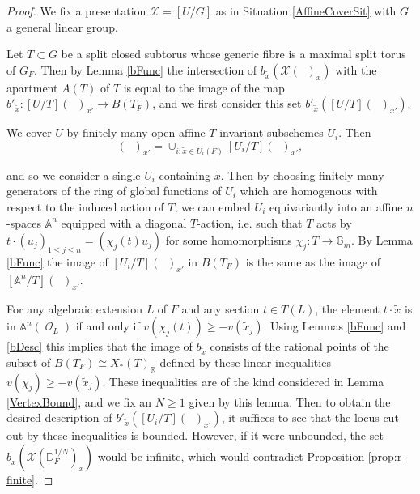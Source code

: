 \documentclass{article}
\DeclareMathOperator{\CO}{\mathcal{O}}
\newcommand{\BA}{{\mathbb{A}}}
\newcommand{\BG}{{\mathbb{G}}}
\newcommand{\BR}{{\mathbb{R}}}
\newcommand{\CX}{{\mathcal X}}
\newcommand{\Dr}[1][r]{\mathbb{D}_F^{1/#1}}
\DeclareMathOperator{\Dinfty}{\mathbb{D}_F^{1/\infty}}
\theoremstyle{definition}
\theoremstyle{plain}
\begin{document}
\begin{proof}
 We fix a presentation $\CX=[U/G]$ as in Situation \ref{AffineCoverSit} with $G$ a general linear group.

    Let $T \subset G$ be a split closed subtorus whose generic fibre is a maximal split torus of $G_F$. Then by Lemma \ref{bFunc} the intersection of $b_{\tilde x}(\CX(\Dinfty)_x)$ with the apartment $A(T)$ of $T$ is equal to the image of the map $b'_{\tilde x}\colon [U/T](\Dinfty)_{x'} \to B(T_F)$, and we first consider this set $b'_{\tilde x}([U/T](\Dinfty)_{x'})$.
    
     We cover $U$ by finitely many open affine $T$-invariant subschemes $U_i$. Then
     \begin{equation*}
         [U/T](\Dinfty)_{x'} = \cup_{i\colon \tilde x \in U_i(F)} [U_i/T](\Dinfty)_{x'},
     \end{equation*}
    
    and so we consider a single $U_i$ containing $\tilde x$. Then by choosing finitely many generators of the ring of global functions of $U_i$ which are homogenous with respect to the induced action of $T$, we can embed $U_i$ equivariantly into an affine $n$-spaces $\BA^n$ equipped with a diagonal $T$-action, i.e. such that $T$ acts by $t\cdot (u_j)_{1\leq j \leq n}=(\chi_j(t)u_j)$ for some homomorphisms $\chi_j\colon T \to \BG_m$. By Lemma \ref{bFunc} the image of $[U_i/T](\Dinfty)_{x'}$ in $B(T_F)$ is the same as the image of $[\mathbb{A}^n/T](\Dinfty)_{x'}$. 

    For any algebraic extension $L$ of $F$ and any section $t \in T(L)$, the element $t \cdot \tilde x$ is in $\BA^n(\CO_L)$ if and only if $v(\chi_j(t)) \geq -v(\tilde x_j)$. Using Lemmas \ref{bFunc} and \ref{bDesc} this implies that the image of $b_{\tilde x}$ consists of the rational points of the subset of $B(T_F)\cong X_*(T)_{\BR}$ defined by these linear inequalities $v(\chi_j) \geq -v(\tilde x_j)$. These inequalities are of the kind considered in Lemma \ref{VertexBound}, and we fix an $N \geq 1$ given by this lemma. Then to obtain the desired description of $b'_{\tilde x}([U_i/T](\Dinfty)_{x'})$, it suffices to see that the locus cut out by these inequalities is bounded. However, if it were unbounded, the set $b_{\tilde x}(\CX(\Dr[N])_x)$ would be infinite, which would contradict Proposition \ref{prop:r-finite}.


\end{proof}
\end{document}
